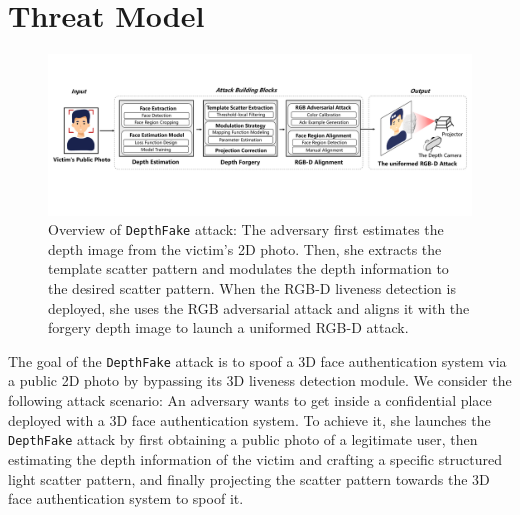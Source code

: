 
\section{Threat Model}


\begin{figure}[pt]
	\centerline{\includegraphics[width = \textwidth]{figures/overview_1.pdf}}
	\vspace{-0.1in}
	\caption{Overview of \texttt{DepthFake} attack: The adversary first estimates the depth image from the victim's 2D photo. Then, she extracts the template scatter pattern and modulates the depth information to the desired scatter pattern. When the RGB-D liveness detection is deployed, she uses the RGB adversarial attack and aligns it with the forgery depth image to launch a uniformed RGB-D attack.}
	\label{overview}
	\vspace{-0.15in}
\end{figure}

The goal of the \texttt{DepthFake} attack is to spoof a 3D face authentication system via a public 2D photo by bypassing its 3D liveness detection module. We consider the following attack scenario: An adversary wants to get inside a confidential place deployed with  a 3D face authentication system. To achieve it, she  launches the \texttt{DepthFake} attack by
first obtaining a public photo of a legitimate user, then estimating the depth information of the victim and crafting a specific structured light scatter pattern, and finally projecting the scatter pattern towards the 3D face authentication system to spoof it.
%
%


